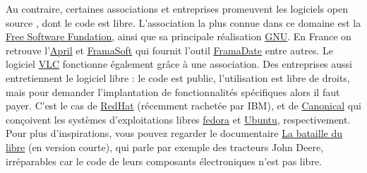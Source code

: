 \documentclass[10pt]{article}
\begin{document}
Au contraire, certaines associations et entreprises promeuvent les logiciels \og open source \fg, dont le code est libre.
L'association la plus connue dans ce domaine est la \href{https://www.fsf.org/}{Free Software Fundation}, ainsi que
sa principale réalisation \href{https://www.gnu.org/}{GNU}. En France on retrouve l'\href{https://www.april.org/}{April} et
\href{https://framasoft.org/fr/}{FramaSoft} qui fournit l'outil \href{https://framadate.org/}{FramaDate} entre autres.
Le logiciel \href{https://www.videolan.org/index.fr.html}{VLC} fonctionne également grâce à une association.
Des entreprises aussi entretiennent le logiciel libre : le code est public, l'utilisation
est libre de droits, mais pour demander l'implantation de fonctionnalités spécifiques alors il faut
payer. C'est le cas de \href{https://www.redhat.com/fr}{RedHat} (récemment rachetée par IBM), et de \href{https://www.canonical.com/}{Canonical}
qui conçoivent les systèmes d'exploitations libres \href{https://getfedora.org/fr/}{fedora} et \href{https://www.ubuntu.com/download}{Ubuntu}, respectivement.
Pour plus d'inspirations, vous pouvez regarder le documentaire \href{https://www.arte.tv/fr/videos/077346-000-A/internet-ou-la-revolution-du-partage/}{La bataille du libre}
(en version courte), qui parle par exemple des tracteurs John Deere, irréparables car le code de leurs composants électroniques n'est pas libre.
\end{document}
